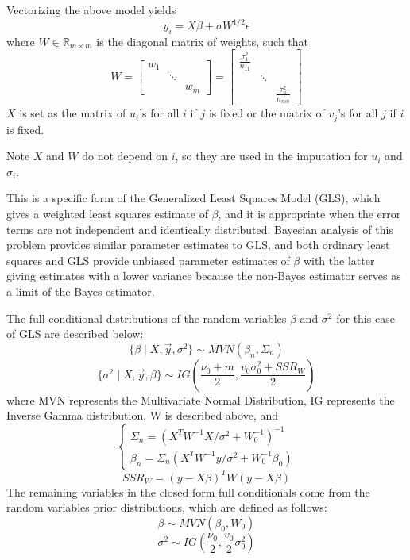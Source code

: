 \documentclass[12pt,twoside]{dukestatscithesis}
\theoremstyle{definition}
\theoremstyle{definition}
\theoremstyle{definition}
\theoremstyle{remark}
\begin{document}
Vectorizing the above model yields
\[y_i = X\beta + \sigma W^{1/2} \epsilon\] where
\(W \in \mathbb{R}_{m \times m}\) is the diagonal matrix of weights,
such that \[
  W =
  \begin{bmatrix}
    w_{1} & & \\
    & \ddots & \\
    & & w_{m}
  \end{bmatrix} 
  = \begin{bmatrix}
    \frac{\tau_1^2}{n_{11}} & & \\
    & \ddots & \\
    & & \frac{\tau_n^2}{n_{mn}}
  \end{bmatrix}\]
\(X\) is set as the matrix of \(u_i\)'s for all \(i\) if \(j\) is fixed
or the matrix of \(v_j\)'s for all \(j\) if \(i\) is fixed.

Note \(X\) and \(W\) do not depend on \(i\), so they are used in the
imputation for \(u_i\) and \(\sigma_i\).

This is a specific form of the Generalized Least Squares Model (GLS),
which gives a weighted least squares estimate of \(\beta\), and it is
appropriate when the error terms are not independent and identically
distributed. Bayesian analysis of this problem provides similar
parameter estimates to GLS, and both ordinary least squares and GLS
provide unbiased parameter estimates of \(\beta\) with the latter giving
estimates with a lower variance because the non-Bayes estimator serves
as a limit of the Bayes estimator.

The full conditional distributions of the random variables \(\beta\) and
\(\sigma^2\) for this case of GLS are described below:
\[\{\beta \mid X, \vec{y}, \sigma^2\} \sim MVN (\beta_n, \Sigma_n)\]
\[\{\sigma^2 \mid X, \vec{y}, \beta\} \sim IG (\frac{\nu_0 + m}{2}, \frac{v_0\sigma^2_0 + SSR_W}{2})\]
where MVN represents the Multivariate Normal Distribution, IG represents
the Inverse Gamma distribution, W is described above, and
\[ \begin{cases}
      \Sigma_n = (X^TW^{-1}X/\sigma^2+W_0^{-1})^{-1}\\
      \beta_n = \Sigma_n(X^TW^{-1}y/\sigma^2 + W_0^{-1} \beta_0)
    \end{cases}\] \[SSR_W = (y - X\beta)^TW(y-X\beta)\]
The remaining variables in the closed form full conditionals come from
the random variables prior distributions, which are defined as follows:
\[\beta \sim MVN (\beta_0, W_0)\]
\[\sigma^2 \sim IG (\frac{\nu_0}{2}, \frac{v_0}{2}\sigma_0^2)\]
\end{document}
